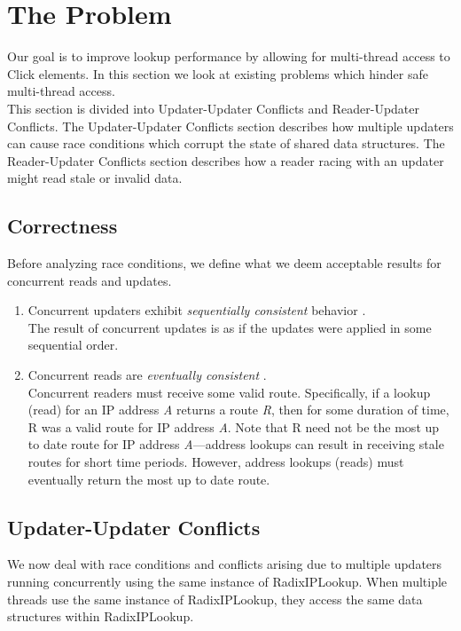 \documentclass[a4paper]{article}
\begin{document}
\section{The Problem}
\label{sec:problem}
Our goal is to improve lookup performance by allowing for multi-thread
access to Click elements. In this section we look at existing problems
which hinder safe multi-thread access.\\

This section is divided into Updater-Updater Conflicts and
Reader-Updater Conflicts. The Updater-Updater Conflicts section
describes how multiple updaters can cause race conditions which
corrupt the state of shared data structures. The Reader-Updater
Conflicts section describes how a reader racing with an updater might
read stale or invalid data.

\subsection{Correctness}
\label{sec:correctness}
Before analyzing race conditions, we define what we deem acceptable results for concurrent reads and updates.
\begin{enumerate}
\item Concurrent updaters exhibit \emph{sequentially consistent} behavior \cite{seqconsistency}.\\ The result of concurrent updates is as if the updates were applied in some sequential order.
\item Concurrent reads are \emph{eventually consistent} \cite{eventualconsistency}.\\ Concurrent readers must receive some valid route. Specifically, if a lookup (read) for an IP address \emph{A} returns a route \emph{R}, then for some duration of time, R was a valid route for IP address \emph{A}. Note that R need not be the most up to date route for IP address \emph{A}---address lookups can result in receiving stale routes for short time periods. However, address lookups (reads) must eventually return the most up to date route.

\end{enumerate} 
\subsection{Updater-Updater Conflicts}
We now deal with race conditions and conflicts arising due to multiple updaters running concurrently using the same instance of RadixIPLookup. When multiple threads use the same instance of RadixIPLookup, they access the same data structures within RadixIPLookup.
\end{document}
